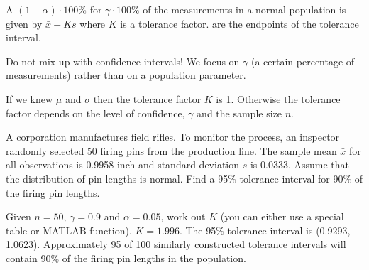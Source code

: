 \begin{definition}
    A $(1-\alpha)\cdot 100\%$  for $\gamma\cdot 100\%$ of the measurements in a normal population is given by $\bar{x}\pm Ks$ where $K$ is a tolerance factor.  are the endpoints of the tolerance interval.
\end{definition}

Do not mix up with confidence intervals! We focus on $\gamma$ (a certain percentage of measurements) rather than on a population parameter.

If we knew $\mu$ and $\sigma$ then the tolerance factor $K$ is 1. Otherwise the tolerance factor depends on the level of confidence, $\gamma$ and the sample size $n$. 

\begin{example}
    A corporation manufactures field rifles. To monitor the process, an inspector randomly selected 50 firing pins from the production line. The sample mean $\bar{x}$ for all observations is 0.9958 inch and standard deviation $s$ is 0.0333. Assume that the distribution of pin lengths is normal. Find a 95\% tolerance interval for 90\% of the firing pin lengths.
    
    Given $n=50$, $\gamma=0.9$ and $\alpha=0.05$, work out $K$ (you can either use a special table or MATLAB function). $K=1.996$. The 95\% tolerance interval is (0.9293, 1.0623). Approximately 95 of 100 similarly constructed tolerance intervals will contain 90\% of the firing pin lengths in the population.
\end{example}